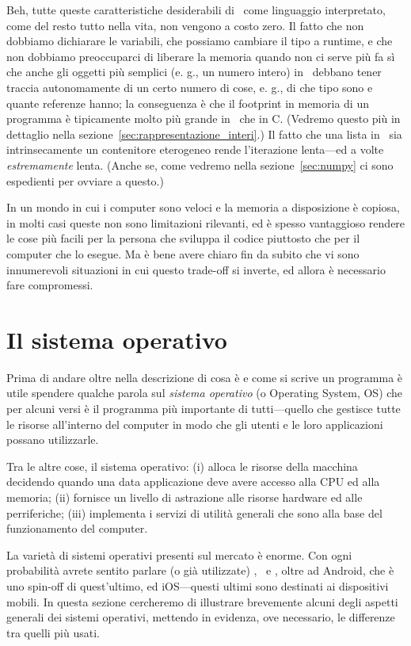 Beh, tutte queste caratteristiche desiderabili di \python\ come linguaggio interpretato,
come del resto tutto nella vita, non vengono a costo zero. Il fatto che non dobbiamo
dichiarare le variabili, che possiamo cambiare il tipo a runtime, e che non dobbiamo
preoccuparci di liberare la memoria quando non ci serve pi\`u fa s\`i che anche
gli oggetti pi\`u semplici (e. g., un numero intero) in \python\ debbano tener traccia
autonomamente di un certo numero di cose, e. g., di che tipo sono e quante referenze
hanno; la conseguenza \`e che il footprint in memoria di un programma \`e tipicamente
molto pi\`u grande in \python\ che in C. (Vedremo questo pi\`u in dettaglio nella
sezione~\ref{sec:rappresentazione_interi}.) Il fatto che una lista in \python\ sia
intrinsecamente un contenitore eterogeneo rende l'iterazione lenta---ed a volte
\emph{estremamente} lenta. (Anche se, come vedremo nella sezione~\ref{sec:numpy}
ci sono espedienti per ovviare a questo.)

In un mondo in cui i computer sono veloci e la memoria a disposizione \`e copiosa,
in molti casi queste non sono limitazioni rilevanti, ed \`e spesso vantaggioso rendere
le cose pi\`u facili per la persona che sviluppa il codice piuttosto che per il
computer che lo esegue. Ma \`e bene avere chiaro fin da subito che vi sono innumerevoli
situazioni in cui questo trade-off si inverte, ed allora \`e necessario fare compromessi.


\section{Il sistema operativo}

Prima di andare oltre nella descrizione di cosa \`e e come si scrive un programma
\`e utile spendere qualche parola sul \emph{sistema operativo} (o Operating System, OS)
che per alcuni versi \`e il programma pi\`u importante di tutti---quello che gestisce
tutte le risorse all'interno del computer in modo che gli utenti e le loro applicazioni
possano utilizzarle.

Tra le altre cose, il sistema operativo: (i) alloca le risorse della macchina decidendo
quando una data applicazione deve avere accesso alla CPU ed alla memoria; (ii) fornisce
un livello di astrazione alle risorse hardware ed alle perriferiche; (iii) implementa
i servizi di utilit\`a generali che sono alla base del funzionamento del computer.

La variet\`a di sistemi operativi presenti sul mercato \`e enorme. Con ogni probabilit\`a
avrete sentito parlare (o gi\`a utilizzate) \windows, \macos\ e \linux, oltre ad
Android, che \`e uno spin-off di quest'ultimo, ed iOS---questi ultimi sono destinati
ai dispositivi mobili. In questa sezione cercheremo di illustrare brevemente alcuni
degli aspetti generali dei sistemi operativi, mettendo in evidenza, ove necessario,
le differenze tra quelli pi\`u usati.


